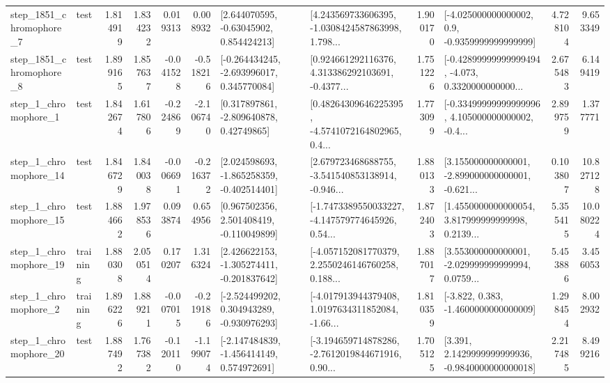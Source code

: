 \begin{tabular}{llrrrrllrlrr}
  step\_1851\_chromophore\_7 &      test &      1.814919 &    1.834232 &      0.019313 &  0.008932 &     [2.644070595, -0.63045902, 0.854424213] &  [4.243569733606395, -1.0308424587863998, 1.798... &       1.900170 &     [-4.025000000000002, 0.9, -0.9359999999999999] &            4.728104 &          9.653349 \\
  step\_1851\_chromophore\_8 &      test &      1.899165 &    1.857637 &     -0.041528 & -0.518216 &   [-0.264434245, -2.693996017, 0.345770084] &  [0.924661292116376, 4.313386292103691, -0.4377... &       1.751226 &  [-0.42899999999999494, -4.073, 0.3320000000000... &            2.675483 &          6.149419 \\
     step\_1\_chromophore\_1 &      test &      1.842674 &    1.617806 &     -0.224869 & -2.106740 &     [0.317897861, -2.809640878, 0.42749865] &  [0.48264309646225395, -4.5741072164802965, 0.4... &       1.773099 &  [-0.33499999999999996, 4.105000000000002, -0.4... &            2.899759 &          1.377771 \\
    step\_1\_chromophore\_14 &      test &      1.846729 &    1.840038 &     -0.006691 & -0.216372 &   [2.024598693, -1.865258359, -0.402514401] &  [2.679723468688755, -3.541540853138914, -0.946... &       1.880133 &  [3.155000000000001, -2.899000000000001, -0.621... &            0.103807 &         10.827128 \\
    step\_1\_chromophore\_15 &      test &      1.884662 &    1.978536 &      0.093874 &  0.654956 &    [0.967502356, 2.501408419, -0.110049899] &  [-1.7473389550033227, -4.147579774645926, 0.54... &       1.872403 &  [1.4550000000000054, 3.817999999999998, 0.2139... &            5.355415 &         10.080224 \\
    step\_1\_chromophore\_19 &  training &      1.880308 &    2.050514 &      0.170207 &  1.316324 &   [2.426622153, -1.305274411, -0.201837642] &  [-4.057152081770379, 2.2550246146760258, 0.188... &       1.887017 &  [3.553000000000001, -2.029999999999994, 0.0759... &            5.453886 &          3.456053 \\
     step\_1\_chromophore\_2 &  training &      1.896226 &    1.889211 &     -0.007015 & -0.219186 &   [-2.524499202, 0.304943289, -0.930976293] &  [-4.017913944379408, 1.0197634311852084, -1.66... &       1.810359 &               [-3.822, 0.383, -1.4600000000000009] &            1.298454 &          8.002932 \\
    step\_1\_chromophore\_20 &      test &      1.887492 &    1.767382 &     -0.120110 & -1.199074 &   [-2.147484839, -1.456414149, 0.574972691] &  [-3.194659714878286, -2.7612019844671916, 0.90... &       1.705125 &   [3.391, 2.1429999999999936, -0.9840000000000018] &            2.217485 &          8.499216 \\

\end{tabular}
